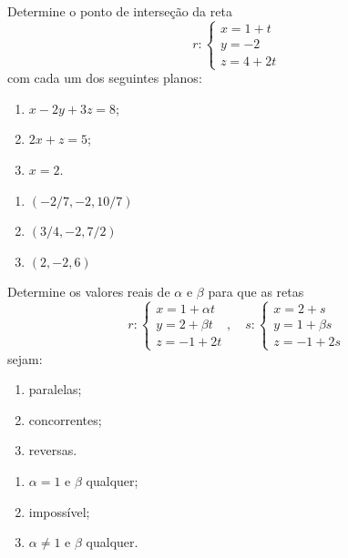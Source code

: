 \documentclass[12pt]{exam}
\begin{document}
\begin{exercicio}
    Determine o ponto de interseção da reta
    \[
        r: \begin{cases}
            x = 1 + t \\
            y = -2    \\
            z = 4 + 2t
        \end{cases}
    \]
    com cada um dos seguintes planos:
    \begin{enumerate}[label=({\alph*})]
        \item $x - 2y + 3z = 8$;
        \item $2x + z = 5$;
        \item $x = 2$.
    \end{enumerate}
    \begin{solucao}
        \begin{enumerate}[label=({\alph*})]
            \item $(-2/7,-2,10/7)$
            \item $(3/4,-2,7/2)$
            \item $(2,-2,6)$
        \end{enumerate}
    \end{solucao}
\end{exercicio}

\begin{exercicio}
    Determine os valores reais de $\alpha$ e $\beta$ para que as retas
    \[
        r: \begin{cases}
            x = 1 + \alpha t \\
            y = 2 + \beta t  \\
            z = -1 + 2t
        \end{cases},\quad
        s: \begin{cases}
            x = 2 + s       \\
            y = 1 + \beta s \\
            z = -1 + 2s
        \end{cases}
    \]
    sejam:
    \begin{enumerate}[label=({\alph*})]
        \item paralelas;
        \item concorrentes;
        \item reversas.
    \end{enumerate}
    \begin{solucao}
        \begin{enumerate}[label=({\alph*})]
            \item $\alpha = 1$ e $\beta$ qualquer;
            \item impossível;
            \item $\alpha \ne 1$ e $\beta$ qualquer.
        \end{enumerate}
    \end{solucao}
\end{exercicio}
\end{document}
